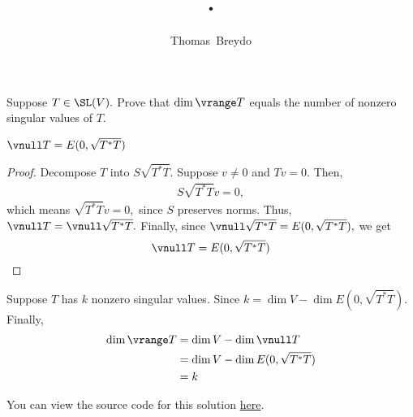 \documentclass{amsart}
\title{\pagenum.\probnum}
\author{Thomas\ Breydo}
\newcommand{\pagenum}{239}
\newcommand{\probnum}{14}
\begin{document}
\maketitle

\begin{problem*}
Suppose $T\in\SL(V).$
Prove that $\dim\vrange T$ equals the number of
nonzero singular values of $T$.
\end{problem*}

\vspace{0.5in}

\begin{claim*}
$\vnull T = E(0, \sqrt{T^*T})$ 
\end{claim*}
\begin{proof}
Decompose $T$ into $S\sqrt{T^*T}.$ Suppose $v\ne0$ and $Tv=0.$
Then,
\begin{align*}
   S\sqrt{T^*T}v = 0,
\end{align*}
which means $\sqrt{T^*T}v=0,$ since $S$ preserves norms. Thus,
$\vnull T = \vnull\sqrt{T^*T}.$ Finally, since
$\vnull\sqrt{T^*T}=E(0, \sqrt{T^*T}),$ we get
$$\vnull T = E(0, \sqrt{T^*T})$$
\end{proof}

\vspace{0.25in}

Suppose $T$ has $k$ nonzero singular values.
Since $k=\dim V - \dim E(0,\sqrt{T^*T}).$ Finally,
\begin{align*}
    \dim\vrange T &= \dim V - \dim\vnull T \\
                 &= \dim V - \dim E(0,\sqrt{T^*T}) \\
                 &= k
\end{align*}

\vspace{0.5in}

\begin{note*}
You can view the source code for this solution
\href{https://github.com/thomasbreydo/linalg/blob/main/\pagenum_\probnum_Thomas_Breydo.tex}
{here}.
\end{note*}
\end{document}
